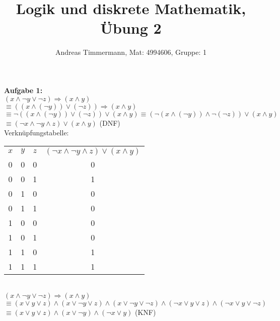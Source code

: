 \documentclass[a4paper]{scrartcl}
\title{Logik und diskrete Mathematik, Übung 2}
\author{Andreas Timmermann, Mat: 4994606, Gruppe: 1}
\begin{document}
	\maketitle
	\begin{flushleft}
		\textbf{Aufgabe 1:}\\
		$(x\wedge\neg y\vee\neg z)\Rightarrow(x\wedge y)$\\
		$\equiv ((x\wedge(\neg y))\vee(\neg z))\Rightarrow(x\wedge y)$ \\
		$\equiv \neg((x\wedge(\neg y))\vee(\neg z))\vee(x\wedge y) \equiv (\neg(x\wedge(\neg y))\wedge\neg(\neg z))\vee(x\wedge y)$\\			$\equiv (\neg x \wedge \neg y \wedge z)\vee(x\wedge y)$ (DNF)\\[1em]
		Verknüpfungstabelle: \\
		\begin{tabular}{|c|c|c|c|}
			$x$ & $y$ & $z$ & $(\neg x \wedge \neg y \wedge z)\vee(x\wedge y)$ \\
			0 & 0 & 0 & 0 \\
			0 & 0 & 1 & 1 \\
			0 & 1 & 0 & 0 \\
			0 & 1 & 1 & 0 \\
			1 & 0 & 0 & 0 \\
			1 & 0 & 1 & 0 \\
			1 & 1 & 0 & 1 \\
			1 & 1 & 1 & 1 \\
		 \end{tabular}\\[1em]
		 $(x\wedge\neg y\vee\neg z)\Rightarrow(x\wedge y)$\\
		 $\equiv (x\vee y\vee z)\wedge (x\vee \neg y\vee z)\wedge (x\vee \neg y\vee \neg z)\wedge (\neg x\vee y\vee z)\wedge (\neg x\vee y\vee \neg z)$\\
		 $\equiv (x\vee y\vee z)\wedge (x\vee \neg y)\wedge (\neg x\vee y)$ (KNF)\\
 	\end{flushleft}
\end{document}
